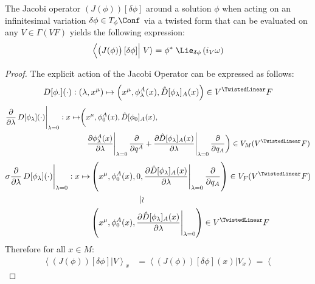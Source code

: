 \documentclass[a4paper,12pt,fleqn]{scrartcl}  %
\begin{document}
\begin{lemma}\label{Prop:JacobieLie}
	The Jacobi operator $\left(J(\phi) \right) [\delta \phi]$
	around a solution $\phi$ when acting on an infinitesimal variation $\delta \phi \in T_\phi \Conf$
	via a twisted form that can be evaluated on any $V \in \Gamma\left(V F \right)$
	yields the following expression:
	\begin{displaymath}	
		\left\langle \left(J(\phi) \right) [\delta \phi] \right\vert
		\left. V \right\rangle =
		\phi^\ast \; \Lie_{\delta \phi} \left( i_V \omega \right)
	\end{displaymath}
\end{lemma}
\begin{proof}
The explicit action of the Jacobi Operator can be expressed as follows:
\begin{displaymath}
	D[\phi_\cdot](\cdot): (\lambda, x^\mu) \mapsto
	\left( x^\mu, \phi_\lambda^A (x), \hat{D}[\phi_\lambda]_A(x) \right)
	\in V^\TwistedLinear F 
\end{displaymath}
%
\begin{align*}
	\frac{\partial}{\partial \lambda} \eval{D[\phi_\lambda](\cdot)}_{\lambda=0}:
	x \mapsto
	\biggr(& x^\mu, \phi_0^A(x), \hat{D}[\phi_0]_A(x),\\
	&	
	\eval{\dfrac{\partial \phi^A_\lambda(x)}{\partial \lambda}}_{\lambda=0}
	 \dfrac{\partial}{\partial q^A} + 
	\eval{\dfrac{\partial \hat{D}[\phi_\lambda]_A(x)}{\partial \lambda}}_{\lambda=0}
	 \dfrac{\partial}{\partial q_A}	  \biggr)
	 \in V_M(V^\TwistedLinear F)
\end{align*}
\begin{align*}
	\sigma \frac{\partial}{\partial \lambda} \eval{D[\phi_\lambda](\cdot)}_{\lambda=0}:
	x \mapsto &
	\left( x^\mu, \phi_0^A(x), 0,
	\eval{\dfrac{\partial \hat{D}[\phi_\lambda]_A(x)}{\partial \lambda}}_{\lambda=0}
	 \dfrac{\partial}{\partial q_A}	  \right)
	 \in V_F(V^\TwistedLinear F) \\
	 & \qquad \qquad \qquad \vert\wr \\
	 &
		\left( x^\mu, \phi_0^A(x),
			\eval{\dfrac{\partial \hat{D}[\phi_\lambda]_A(x)}{\partial \lambda}}_{\lambda=0} \right)
	 		\in V^\TwistedLinear F 
\end{align*}
	Therefore for all $x\in M$:
	\begin{align*}
		\left\langle \left(J(\phi) \right) [\delta \phi] \right\vert
		\left. V \right\rangle_x &=
		\left\langle \left(J(\phi) \right) [\delta \phi] (x) \right\vert
		\left. V_x \right\rangle =
		\left\langle\left.		

\end{align*}
\end{proof}
\end{document}
